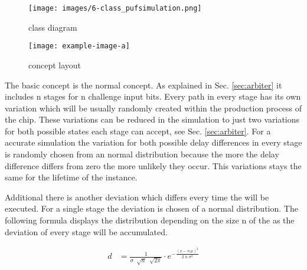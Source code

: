 \begin{figure}[ht]
\texttt{[image: images/6-class\_pufsimulation.png]}
\caption{\apufs class diagram}
\label{class:pufsimulation}
\end{figure}

\begin{figure}[ht]
\noindent\texttt{[image: example-image-a]}
\caption{\apufs concept layout}
\label{fig:pufconceptlayout}
\end{figure}

The basic concept is the normal \apuf concept. 
As explained in Sec. \ref{sec:arbiter} it includes n stages for n challenge input bits.
Every path in every stage has its own variation which will be usually randomly created within the production process of the chip. 
These variations can be reduced in the simulation to just two variations for both possible states each stage can accept, see Sec. \ref{sec:arbiter}.
For a accurate simulation the variation for both possible delay differences in every stage is randomly chosen from an normal distribution because the more the delay difference differs from zero the more unlikely they occur.
This variations stays the same for the lifetime of the \puf instance.

Additional there is another deviation which differs every time the \puf will be executed.
For a single stage the deviation is chosen of a normal distribution. 
The following formula displays the distribution depending on the size n of the \puf as the deviation of every stage will be accumulated.

\begin{align*}
d &= \frac{1}{\sigma\;\sqrt[]{n}\;\sqrt[]{2\pi}} \cdot e^{-\frac{(x-n\,\mu)^2}{2\;n\;\sigma^2}}
\end{align*}

